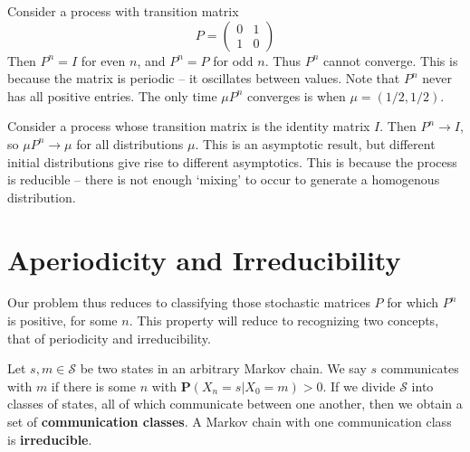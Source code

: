 \begin{example}
    Consider a process with transition matrix
    \[ P = \begin{pmatrix} 0 & 1 \\ 1 & 0 \end{pmatrix} \]
    Then $P^n = I$ for even $n$, and $P^n = P$ for odd $n$. Thus $P^n$ cannot converge. This is because the matrix is periodic -- it oscillates between values. Note that $P^n$ never has all positive entries. The only time $\mu P^n$ converges is when $\mu = (1/2, 1/2)$.
\end{example}

\begin{example}
    Consider a process whose transition matrix is the identity matrix $I$. Then $P^n \to I$, so $\mu P^n \to \mu$ for all distributions $\mu$. This is an asymptotic result, but different initial distributions give rise to different asymptotics. This is because the process is reducible -- there is not enough `mixing' to occur to generate a homogenous distribution.
\end{example}

\section{Aperiodicity and Irreducibility}

Our problem thus reduces to classifying those stochastic matrices $P$ for which $P^n$ is positive, for some $n$. This property will reduce to recognizing two concepts, that of periodicity and irreducibility.

\begin{definition}
    Let $s,m \in \mathcal{S}$ be two states in an arbitrary Markov chain. We say $s$ communicates with $m$ if there is some $n$ with $\mathbf{P}(X_n = s | X_0 = m) > 0$. If we divide $\mathcal{S}$ into classes of states, all of which communicate between one another, then we obtain a set of {\bf communication classes}. A Markov chain with one communication class is {\bf irreducible}.
\end{definition}

